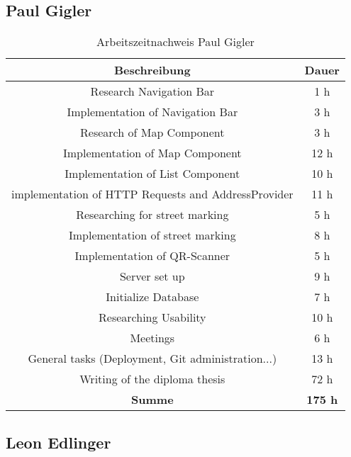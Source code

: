 \subsection{Paul Gigler}

\begin{table}[H]
  \centering
  \begin{tabular}{|c|c|}
  \hline
  \multicolumn{1}{|c|}{\textbf{Beschreibung}}  &
  \multicolumn{1}{c|}{\textbf{Dauer}}  \\ \hline
    Research Navigation Bar & 1 h \\ \hline
    Implementation of Navigation Bar & 3 h \\ \hline
    Research of Map Component & 3 h \\ \hline
    Implementation of Map Component & 12 h \\ \hline
    Implementation of List Component & 10 h \\ \hline
    implementation of HTTP Requests and AddressProvider & 11 h \\ \hline
    Researching for street marking & 5 h \\ \hline
    Implementation of street marking & 8 h \\ \hline
    Implementation of QR-Scanner & 5 h \\ \hline
    Server set up & 9 h \\ \hline
    Initialize Database & 7 h \\ \hline
    Researching Usability & 10 h \\ \hline
    Meetings & 6 h \\ \hline
    General tasks (Deployment, Git administration...) & 13 h \\ \hline
    Writing of the diploma thesis & 72 h \\ \hline
    {\textbf{Summe}} & \textbf{175 h} \\ \hline
   \end{tabular}
  \caption{Arbeitszeitnachweis Paul Gigler}
  \end{table}

  \subsection{Leon Edlinger}

